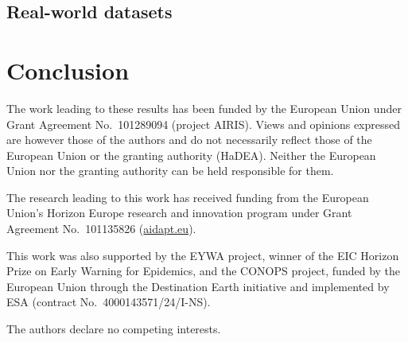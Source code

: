 \documentclass{article}
\theoremstyle{plain}
\theoremstyle{definition}
\theoremstyle{remark}
\begin{document}
\vspace{-0.5em}
\subsection{Real-world datasets}
\label{sec:real-datasets}


\vspace{-0.5em}
\section{Conclusion}\label{sec:conclusion}
\label{sec:limitations}


\begin{ack}
The work leading to these results has been funded by the European Union under Grant Agreement No.~101289094 (project AIRIS). Views and opinions expressed are however those of the authors and do not necessarily reflect those of the European Union or the granting authority (HaDEA). Neither the European Union nor the granting authority can be held responsible for them.

The research leading to this work has received funding from the European Union's Horizon Europe research and innovation program under Grant Agreement No.~101135826 (\href{https://aidapt.eu}{aidapt.eu}).

This work was also supported by the EYWA project, winner of the EIC Horizon Prize on Early Warning for Epidemics, and the CONOPS project, funded by the European Union through the Destination Earth initiative and implemented by ESA (contract No.~4000143571/24/I-NS).

The authors declare no competing interests.
\end{ack}




\clearpage
\appendix

\end{document}
